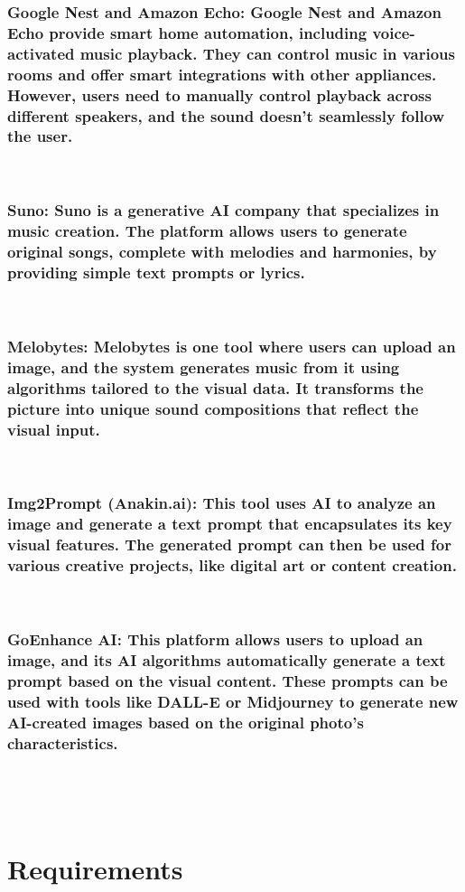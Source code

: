 \documentclass[conference]{IEEEtran}
\begin{document}
\subsubsection{Google Nest and Amazon Echo: Google Nest and Amazon Echo provide smart home automation, including voice-activated music playback. They can control music in various rooms and offer smart integrations with other appliances. However, users need to manually control playback across different speakers, and the sound doesn’t seamlessly follow the user. }

\
\subsubsection{Suno: Suno is a generative AI company that specializes in music creation. The platform allows users to generate original songs, complete with melodies and harmonies, by providing simple text prompts or lyrics.}
\

\subsubsection{Melobytes: Melobytes is one tool where users can upload an image, and the system generates music from it using algorithms tailored to the visual data. It transforms the picture into unique sound compositions that reflect the visual input.}
\

\subsubsection{Img2Prompt (Anakin.ai): This tool uses AI to analyze an image and generate a text prompt that encapsulates its key visual features. The generated prompt can then be used for various creative projects, like digital art or content creation.}
\

\subsubsection{GoEnhance AI: This platform allows users to upload an image, and its AI algorithms automatically generate a text prompt based on the visual content. These prompts can be used with tools like DALL-E or Midjourney to generate new AI-created images based on the original photo's characteristics.}

\

\

\section{Requirements}
\end{document}
